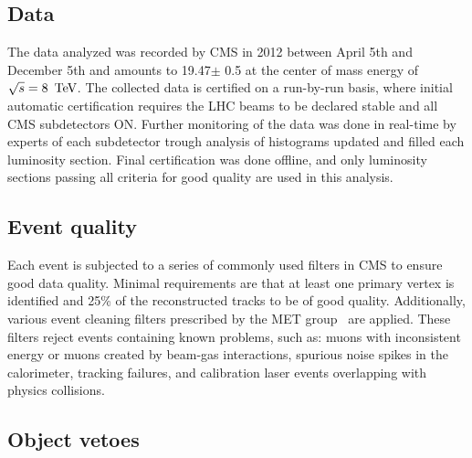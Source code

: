 \subsection{Data}
The data analyzed was recorded by CMS in 2012 between April 5th and December 5th and
amounts to 19.47$\pm$ 0.5 \fbinv at the center of mass energy of $\sqrt{s} = 8~\,\text{Te\hspace{-.08em}V}$. 
The collected data is certified on a run-by-run basis, where initial automatic certification 
requires the LHC beams to be declared stable and all CMS subdetectors ON. Further monitoring 
of the data was done in real-time by experts of each subdetector trough analysis of 
histograms updated and filled each luminosity section. Final certification was done offline, 
and only luminosity sections passing all criteria for good quality are used in this analysis.

\subsection{Event quality\label{sec:met-filters}}

Each event is subjected to a series of commonly used filters in CMS to ensure good
data quality. Minimal requirements are that at least one primary vertex is identified 
and 25\% of the reconstructed tracks to be of good quality. Additionally, various event 
cleaning filters prescribed by the MET group~\cite{ref:MET-filters} are applied. These 
filters reject events containing known problems, such as: muons with inconsistent energy or 
muons created by beam-gas interactions, spurious noise spikes in the calorimeter, tracking
failures, and calibration laser events overlapping with physics collisions. 





\subsection{Object vetoes\label{sec:vetoes}}

